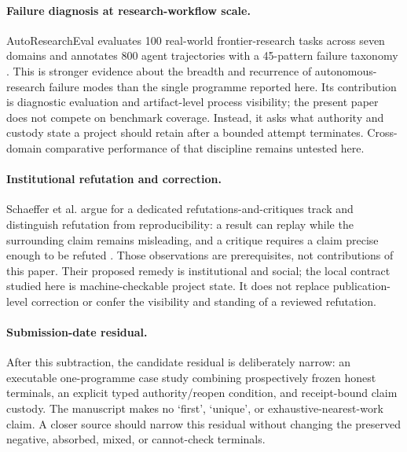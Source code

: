 \paragraph{Failure diagnosis at research-workflow scale.}
AutoResearchEval evaluates 100 real-world frontier-research tasks across seven domains and annotates 800 agent trajectories with a 45-pattern failure taxonomy \cite{fei2026autoresearcheval}. This is stronger evidence about the breadth and recurrence of autonomous-research failure modes than the single programme reported here. Its contribution is diagnostic evaluation and artifact-level process visibility; the present paper does not compete on benchmark coverage. Instead, it asks what authority and custody state a project should retain after a bounded attempt terminates. Cross-domain comparative performance of that discipline remains untested here.

\paragraph{Institutional refutation and correction.}
Schaeffer et al. argue for a dedicated refutations-and-critiques track and distinguish refutation from reproducibility: a result can replay while the surrounding claim remains misleading, and a critique requires a claim precise enough to be refuted \cite{schaeffer2025refutations}. Those observations are prerequisites, not contributions of this paper. Their proposed remedy is institutional and social; the local contract studied here is machine-checkable project state. It does not replace publication-level correction or confer the visibility and standing of a reviewed refutation.

\paragraph{Submission-date residual.}
After this subtraction, the candidate residual is deliberately narrow: an executable one-programme case study combining prospectively frozen honest terminals, an explicit typed authority/reopen condition, and receipt-bound claim custody. The manuscript makes no `first', `unique', or exhaustive-nearest-work claim. A closer source should narrow this residual without changing the preserved negative, absorbed, mixed, or cannot-check terminals.